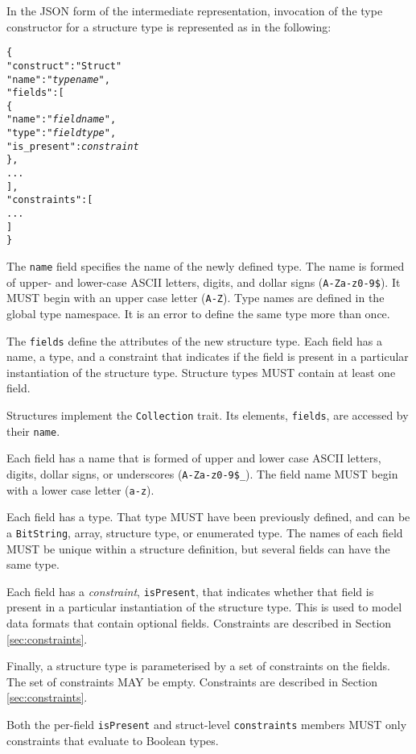 \documentclass[10pt,twocolumn,a4paper]{article}
\newcommand{\code}[1]{\texttt{#1}}
\begin{document}
In the JSON form of the intermediate representation, invocation of the type
constructor for a structure type is represented as in the following:
\footnotesize
\begin{alltt}
  \{
    "construct"   : "Struct"
    "name"        : "\emph{type name}",
    "fields"      : [
      \{
        "name"       : "\emph{field name}",
        "type"       : "\emph{field type}",
        "is\_present" : \emph{constraint}
      \},
      ...
    ],
    "constraints" : [
      ...
    ]
  \}
\end{alltt}
\normalsize
The \code{name} field specifies the name of the newly defined type. The
name is formed of upper- and lower-case ASCII letters, digits, and dollar
signs (\code{A-Za-z0-9\$}).  It MUST begin with an upper case letter
(\code{A-Z}). Type names are defined in the global type namespace.
It is an error to define the same type more than once.

The \code{fields} define the attributes of the new structure type. Each
field has a name, a type, and a constraint that indicates if the field is
present in a particular instantiation of the structure type. Structure
types MUST contain at least one field.

Structures implement the \code{Collection} trait. Its elements, \code{fields}, are
accessed by their \code{name}.

Each field has a name that is formed of upper and lower case ASCII letters,
digits, dollar signs, or underscores (\code{A-Za-z0-9\$\_}). The field name
MUST begin with a lower case letter (\code{a-z}).

Each field has a type. That type MUST have been previously defined, and can
be a \code{BitString}, array, structure type, or enumerated type. The names
of each field MUST be unique within a structure definition, but several
fields can have the same type.

Each field has a \emph{constraint}, \code{isPresent}, that indicates
whether that field is present in a particular instantiation of the
structure type. This is used to model data formats that contain optional
fields. Constraints are described in Section \ref{sec:constraints}.

Finally, a structure type is parameterised by a set of constraints on the
fields. The set of constraints MAY be empty. Constraints are described in
Section \ref{sec:constraints}.

Both the per-field \code{isPresent} and struct-level \code{constraints} members MUST
only constraints that evaluate to Boolean types.
\end{document}
